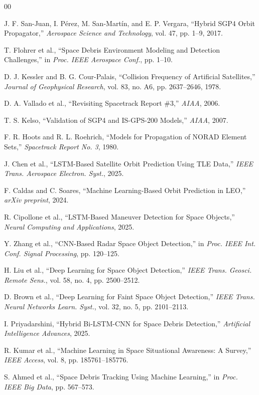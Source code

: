 \documentclass{ieeeaccess}
\begin{document}
\begin{thebibliography}{00}

 J. F. San-Juan, I. Pérez, M. San-Martín, and E. P. Vergara, “Hybrid SGP4 Orbit Propagator,” \emph{Aerospace Science and Technology}, vol. 47, pp. 1--9, 2017.

 T. Flohrer et al., “Space Debris Environment Modeling and Detection Challenges,” in \emph{Proc. IEEE Aerospace Conf.}, pp. 1--10.

 D. J. Kessler and B. G. Cour-Palais, “Collision Frequency of Artificial Satellites,” \emph{Journal of Geophysical Research}, vol. 83, no. A6, pp. 2637--2646, 1978.

 D. A. Vallado et al., “Revisiting Spacetrack Report \#3,” \emph{AIAA}, 2006.

 T. S. Kelso, “Validation of SGP4 and IS-GPS-200 Models,” \emph{AIAA}, 2007.

 F. R. Hoots and R. L. Roehrich, “Models for Propagation of NORAD Element Sets,” \emph{Spacetrack Report No. 3}, 1980.

 J. Chen et al., “LSTM-Based Satellite Orbit Prediction Using TLE Data,” \emph{IEEE Trans. Aerospace Electron. Syst.}, 2025.

 F. Caldas and C. Soares, “Machine Learning-Based Orbit Prediction in LEO,” \emph{arXiv preprint}, 2024.

 R. Cipollone et al., “LSTM-Based Maneuver Detection for Space Objects,” \emph{Neural Computing and Applications}, 2025.

 Y. Zhang et al., “CNN-Based Radar Space Object Detection,” in \emph{Proc. IEEE Int. Conf. Signal Processing}, pp. 120--125.

 H. Liu et al., “Deep Learning for Space Object Detection,” \emph{IEEE Trans. Geosci. Remote Sens.}, vol. 58, no. 4, pp. 2500--2512.

 D. Brown et al., “Deep Learning for Faint Space Object Detection,” \emph{IEEE Trans. Neural Networks Learn. Syst.}, vol. 32, no. 5, pp. 2101--2113.

 I. Priyadarshini, “Hybrid Bi-LSTM-CNN for Space Debris Detection,” \emph{Artificial Intelligence Advances}, 2025.

 R. Kumar et al., “Machine Learning in Space Situational Awareness: A Survey,” \emph{IEEE Access}, vol. 8, pp. 185761--185776.

 S. Ahmed et al., “Space Debris Tracking Using Machine Learning,” in \emph{Proc. IEEE Big Data}, pp. 567--573.


\end{thebibliography}
\end{document}
